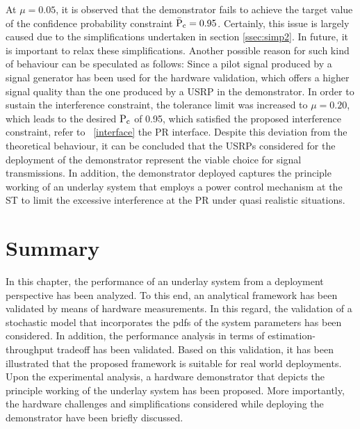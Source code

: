 At $\mu = 0.05$, it is observed that the demonstrator fails to achieve the target value of the confidence probability constraint $\bar{\text{P}}_{\text{c}} = 0.95$. Certainly, this issue is largely caused due to the simplifications undertaken in section \ref{ssec:simp2}. In future, it is important to relax these simplifications. Another possible reason for such kind of behaviour can be speculated as follows: Since a pilot signal produced by a signal generator has been used for the hardware validation, which offers a higher signal quality than the one produced by a USRP in the demonstrator. 
In order to sustain the interference constraint, the tolerance limit was increased to $\mu = 0.20$, which leads to the desired $\text{P}_{\text{c}}$ of 0.95, which satisfied the proposed interference constraint, refer to \figurename~\ref{interface} the PR interface. Despite this deviation from the theoretical behaviour, it can be concluded that the USRPs considered for the deployment of the demonstrator represent the viable choice for signal transmissions. In addition, the demonstrator deployed captures the principle working of an underlay system that employs a power control mechanism at the ST to limit the excessive interference at the PR under quasi realistic situations. 


\section{Summary}
\label{con}

In this chapter, the performance of an underlay system from a deployment perspective has been analyzed. To this end, an analytical framework has been validated by means of hardware measurements. In this regard, the validation of a stochastic model that incorporates the pdfs of the system parameters has been considered. In addition, the performance analysis in terms of estimation-throughput tradeoff has been validated. Based on this validation, it has been illustrated that the proposed framework is suitable for real world deployments. Upon the experimental analysis, a hardware demonstrator that depicts the principle working of the underlay system has been proposed. More importantly, the hardware challenges and simplifications considered while deploying the demonstrator have been briefly discussed.  














